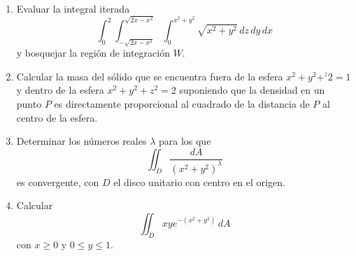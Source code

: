 \documentclass{article}
\begin{document}
\begin{enumerate}
{            \color{azul}
        }

        \item {
            Evaluar la integral iterada
            \[
                \int_{0}^{2}{
                    \int_{-\sqrt{2x-x^2}}^{\sqrt{2x-x^2}}{
                        \int_{0}^{x^2+y^2}{
                            \sqrt{x^2+y^2}
                        \,dz}
                    \,dy}
                \,dx}
            \]
            y bosquejar la región de integración $W$.

            \color{azul}
        }

        \item {
            Calcular la masa del sólido que se encuentra fuera de la esfera
            $x^2+y^2+^z2=1$ y dentro de la esfera $x^2+y^2+z^2=2$ suponiendo
            que la densidad en un punto $P$ es directamente proporcional al
            cuadrado de la distancia de $P$ al centro de la esfera.

            \color{azul}
        }

        \item {
            Determinar los números reales $\lambda$ para los que
            \[
                \iint_D {\frac{dA}{\left(x^2+y^2\right)^\lambda}}
            \]
            es convergente, con $D$ el disco unitario con centro en el origen.

            \color{azul}
        }

        \item {
            Calcular
            \[
                \iint_D {xye^{-\left(x^2+y^2\right)}\,dA}
            \]
            con $x\geq 0$ y $0\leq y\leq 1$.

            \color{azul}
        }
    \end{enumerate}
\end{document}
